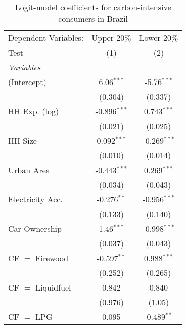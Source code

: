 
\begin{table}[htbp!]
   \centering
   \small
   \begin{adjustbox}{width = 1\textwidth, max height = 0.95\textheight, center}
      \begin{threeparttable}[b]
         \caption{\label{tab:Logit_1_BRA} Logit-model coefficients for carbon-intensive consumers in Brazil}
         \begin{tabular}{lcc}
            \tabularnewline \midrule \midrule
            Dependent Variables: & Upper 20\%     & Lower 20\%\\   
            Test                 & (1)            & (2)\\  
            \midrule
            \emph{Variables}\\
            (Intercept)          & 6.06$^{***}$   & -5.76$^{***}$\\   
                                 & (0.304)        & (0.337)\\   
            HH Exp. (log)        & -0.896$^{***}$ & 0.743$^{***}$\\   
                                 & (0.021)        & (0.025)\\   
            HH Size              & 0.092$^{***}$  & -0.269$^{***}$\\   
                                 & (0.010)        & (0.014)\\   
            Urban Area           & -0.443$^{***}$ & 0.269$^{***}$\\   
                                 & (0.034)        & (0.043)\\   
            Electricity Acc.     & -0.276$^{**}$  & -0.956$^{***}$\\   
                                 & (0.133)        & (0.140)\\   
            Car Ownership        & 1.46$^{***}$   & -0.998$^{***}$\\   
                                 & (0.037)        & (0.043)\\   
            CF $=$ Firewood      & -0.597$^{**}$  & 0.988$^{***}$\\   
                                 & (0.252)        & (0.265)\\   
            CF $=$ Liquidfuel    & 0.842          & 0.840\\   
                                 & (0.976)        & (1.05)\\   
            CF $=$ LPG           & 0.095          & -0.489$^{**}$\\   

\end{tabular}
\end{threeparttable}
\end{adjustbox}
\end{table}
